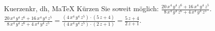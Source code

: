 \begin{MAufgabe}{Kuerzen}{kr, dh, MaTeX}
K\"urzen Sie soweit m\"oglich: $\frac{20\, x^4\, y^4\, z^6 + 16\, x^4\, y^4\, z^5}{8\, x^4\, y^4\, z^6 + 4\, x^4\, y^4\, z^5}$.\\ 
\ifLsg\MLoesung
\quad $\frac{20\, x^4\, y^4\, z^6 + 16\, x^4\, y^4\, z^5}{8\, x^4\, y^4\, z^6 + 4\, x^4\, y^4\, z^5}=\frac{(4\, x^4\, y^4\, z^5)\cdot(5\, z + 4)}{(4\, x^4\, y^4\, z^5)\cdot(2\, z + 1)}=\frac{5\, z + 4}{2\, z + 1}$.\else\relax\fi
 \end{MAufgabe}
